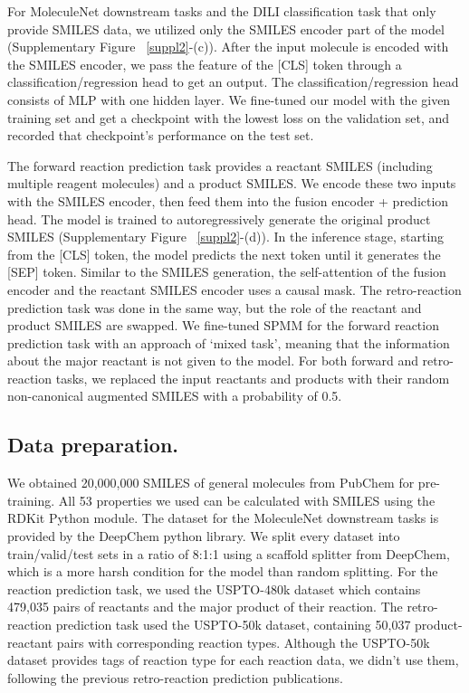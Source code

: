 \documentclass{nature_meth}
\newcommand{\1}{\blmath{1}}
\newcommand{\0}{\blmath{0}}
\begin{document}
For MoleculeNet downstream tasks and the DILI classification task that only provide SMILES data, we utilized only the SMILES encoder part of the model (Supplementary Figure ~\ref{suppl2}-(c)).
After the input molecule is encoded with the SMILES encoder, we pass the feature of the [CLS] token through a classification/regression head to get an output. The classification/regression head consists of MLP with one hidden layer. We fine-tuned our model with the given training set and get a checkpoint with the lowest  loss on the validation set, and recorded that checkpoint's performance on the test set.

The forward reaction prediction task provides a reactant SMILES (including multiple reagent molecules) and a product SMILES. We encode these two inputs with the SMILES encoder, then feed them into the fusion encoder + prediction head. The model is trained to autoregressively generate the original product SMILES (Supplementary Figure ~\ref{suppl2}-(d)). In the inference stage, starting from the [CLS] token, the model predicts the next token until it generates the [SEP] token. Similar to the SMILES generation, the self-attention of the fusion encoder and the reactant SMILES encoder uses a causal mask. The retro-reaction prediction task was done in the same way, but the role of the reactant and product SMILES are swapped. We fine-tuned SPMM for the forward reaction prediction task with an approach of `mixed task', meaning that the information about the major reactant is not given to the model. For both forward and retro-reaction tasks, we replaced the input reactants and products with their random non-canonical augmented SMILES\cite{smiles-aug} with a probability of 0.5.

\subsection{Data preparation.}
We obtained 20,000,000 SMILES of general molecules from PubChem\cite{kim2021pubchem} for pre-training. 
All 53 properties we used can be calculated with SMILES using the RDKit Python module\cite{rdkit}.
The dataset for the MoleculeNet downstream tasks is provided by the DeepChem\cite{deepchem} python library. We split every dataset into train/valid/test sets in a ratio of 8:1:1 using a scaffold splitter from DeepChem, which is a more harsh condition for the model than random splitting.
For the reaction prediction task, we used the USPTO-480k dataset which contains 479,035 pairs of reactants and the major product of their reaction. The retro-reaction prediction task used the USPTO-50k dataset, containing 50,037 product-reactant pairs with corresponding reaction types. Although the USPTO-50k dataset provides tags of reaction type for each reaction data, we didn't use them, following the previous retro-reaction prediction publications. 
\end{document}
